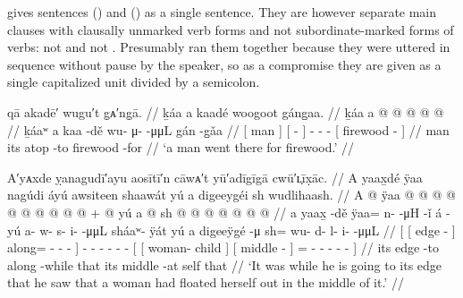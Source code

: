 \citeauthor{swanton:1909} gives sentences (\lastx) and (\nextx) as a single sentence.
They are however separate main clauses with clausally unmarked verb forms and not subordinate-marked forms of verbs:  not  and  not .
Presumably \citeauthor{swanton:1909} ran them together because they were uttered in sequence without pause by the speaker, so as a compromise they are given as a single capitalized unit divided by a semicolon.

\ex\label{ex:94-2-man-went-there-for-firewood}%
%
\begingl
	\glpreamble	qā akadē′ wugu′t g̣ᴀ′ng̣ā. //
	\glpreamble	ḵáa a kaadé woogoot gáng̱aa. //
	\gla	{} ḵáa {} {} a  @ {} {}
		 @ {} @ {} @ {}
		{}  @ {} {} //
	\glb	{} ḵáaʷ {} {} a kaa -dě {}
		wu- μ-  -μμL
		{} gán -g̱ǎa {} //
	\glc	{}[ man {}] {}[   - {}]
		- -  -
		{}[ firewood - {}] //
	\gld	{} man {} {} its atop -to {}
		 {} {} {}
		{} firewood -for {} //
	\glft	‘a man went there for firewood.’
		//
\endgl
\xe

\ex\label{ex:94-3-going-edge-woman-floating-middle}%
%
\begingl
	\glpreamble	A′yᴀxde ỵanagudī′ayu aosītī′n cāwᴀ′t yū′adīgīgā cwū′ʟ̣īx̣āc. //
	\glpreamble	A yaax̱dé ÿaa nagúdi áyú awsiteen shaawát yú a digeeygéi sh wudlihaash. //
	\gla	{} {} A  @ {} {}
			ÿaa @  @ {} @ {} @ {} {}
			 @ {}
		 @ {} @ {} @ {} @ {} @ {} +
		{} {}  @ {} {}
			{} yú a  @ {} {}
			sh @  @ {} @ {} @ {} @ {} @ {} @ {} {}  //
	\glb	{} {} a yaax̱ -dě {} 
			ÿaa= n-  -μH -ǐ {}
			á -yú
		a- w- s- i-  -μμL
		{} {} sháaʷ- ÿát {}
			{} yú a digeeÿgé -μ {}
			sh= wu- d- l- i-  -μμL {} {} //
	\glc	{}[ {}[  edge - {}]
			along= -  - - {}]
			 -
		- - - -  -
		{}[ {}[ woman- child {}]
			{}[   middle - {}]
			= - - - -
				 - \· {}] //
	\gld	{} {} its edge -to {}
			along  {} {} -while {}
			 {} 
		 {} {} {} {} {} 
		{} {}  {} {} 
			{} that its middle -at {}
			self  {} {} {} {} \·that {} //
	\glft	‘It was while he is going to its edge that he saw that a woman had floated herself out in the middle of it.’
		//
\endgl
\xe

